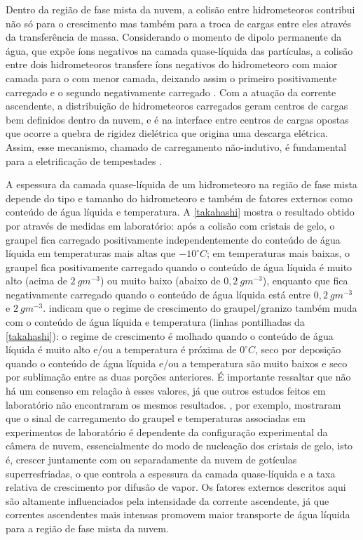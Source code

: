 Dentro da região de fase mista da nuvem, a colisão entre hidrometeoros contribui não só para o crescimento mas também para a troca de cargas entre eles através da transferência de massa. Considerando o momento de dipolo permanente da água, que expõe íons negativos na camada quase-líquida das partículas, a colisão entre dois hidrometeoros transfere íons negativos do hidrometeoro com maior camada para o com menor camada, deixando assim o primeiro positivamente carregado e o segundo negativamente carregado \cite{Baker1987, Baker1994b}. Com a atuação da corrente ascendente, a distribuição de hidrometeoros carregados geram centros de cargas bem definidos dentro da nuvem, e é na interface entre centros de cargas opostas que ocorre a quebra de rigidez dielétrica que origina uma descarga elétrica. Assim, esse mecanismo, chamado de carregamento não-indutivo, é fundamental para a eletrificação de tempestades \cite{Saunders2008}.

A espessura da camada quase-líquida de um hidrometeoro na região de fase mista depende do tipo e tamanho do hidrometeoro e também de fatores externos como conteúdo de água líquida e temperatura. A \autoref{takahashi} mostra o resultado obtido por  através de medidas em laboratório: após a colisão com cristais de gelo, o graupel fica carregado positivamente independentemente do conteúdo de água líquida em temperaturas mais altas que $-10^{\circ}C$; em temperaturas mais baixas, o graupel fica positivamente carregado quando o conteúdo de água líquida é muito alto (acima de $2\:gm^{-3}$) ou muito baixo (abaixo de $0,2\:gm^{-3}$), enquanto que fica negativamente carregado quando o conteúdo de água líquida está entre $0,2\:gm^{-3}$ e $2\:gm^{-3}$.  indicam que o regime de crescimento do graupel/granizo também muda com o conteúdo de água líquida e temperatura (linhas pontilhadas da \autoref{takahashi}): o regime de crescimento é molhado quando o conteúdo de água líquida é muito alto e/ou a temperatura é próxima de $0^{\circ}C$, seco por deposição quando o conteúdo de água líquida e/ou a temperatura são muito baixos e seco por sublimação entre as duas porções anteriores. É importante ressaltar que não há um consenso em relação à esses valores, já que outros estudos feitos em laboratório \cite{Jayaratne1983, Pereyra2000, Saunders2006} não encontraram os mesmos resultados. , por exemplo, mostraram que o sinal de carregamento do graupel e temperaturas associadas em experimentos de laboratório é dependente da configuração experimental da câmera de nuvem, essencialmente do modo de nucleação dos cristais de gelo, isto é, crescer juntamente com ou separadamente da nuvem de gotículas superresfriadas, o que controla a espessura da camada quase-líquida e a taxa relativa de crescimento por difusão de vapor. Os fatores externos descritos aqui são altamente influenciados pela intensidade da corrente ascendente, já que correntes ascendentes mais intensas promovem maior transporte de água líquida para a região de fase mista da nuvem. 

